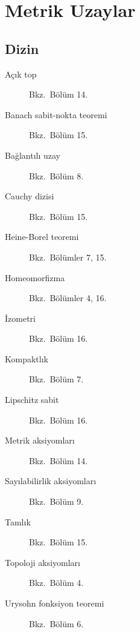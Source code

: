 \documentclass[12pt, a4paper, oneside]{book}
\theoremstyle{definition}
\theoremstyle{remark}
\begin{document}
\part{Metrik Uzaylar}





\appendix


\backmatter

\chapter*{Dizin}

\begin{description}
  \item[Açık top] Bkz.\ Bölüm 14.
  \item[Banach sabit-nokta teoremi] Bkz.\ Bölüm 15.
  \item[Bağlantılı uzay] Bkz.\ Bölüm 8.
  \item[Cauchy dizisi] Bkz.\ Bölüm 15.
  \item[Heine-Borel teoremi] Bkz.\ Bölümler 7, 15.
  \item[Homeomorfizma] Bkz.\ Bölümler 4, 16.
  \item[İzometri] Bkz.\ Bölüm 16.
  \item[Kompaktlık] Bkz.\ Bölüm 7.
  \item[Lipschitz sabit] Bkz.\ Bölüm 16.
  \item[Metrik aksiyomları] Bkz.\ Bölüm 14.
  \item[Sayılabilirlik aksiyomları] Bkz.\ Bölüm 9.
  \item[Tamlık] Bkz.\ Bölüm 15.
  \item[Topoloji aksiyomları] Bkz.\ Bölüm 4.
  \item[Urysohn fonksiyon teoremi] Bkz.\ Bölüm 6.
\end{description}
\end{document}
